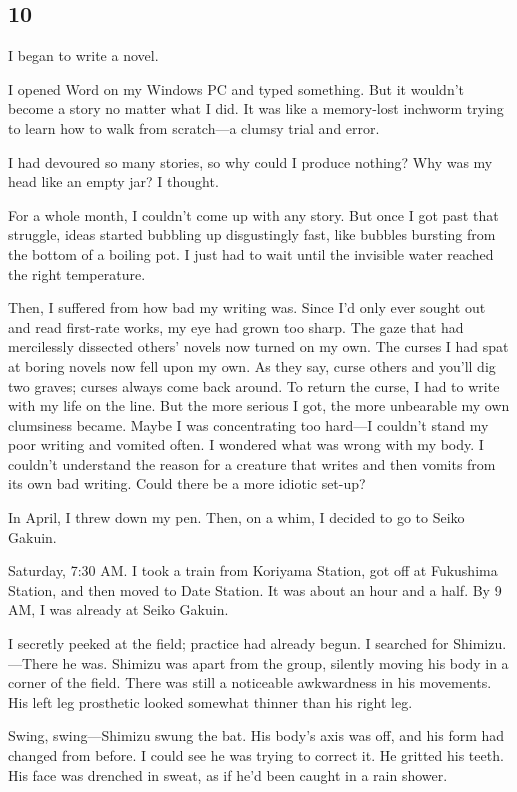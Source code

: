 \documentclass[
    a4paper,
    12pt,
    twoside,
    openany,
    UTF8,
    fontset=windows
]{ctexbook}
\begin{document}
\subsection*{10}

I began to write a novel.

I opened Word on my Windows PC and typed something. But it wouldn't become a story no matter what I did. It was like a memory-lost inchworm trying to learn how to walk from scratch—a clumsy trial and error.

I had devoured so many stories, so why could I produce nothing? Why was my head like an empty jar? I thought.

For a whole month, I couldn't come up with any story. But once I got past that struggle, ideas started bubbling up disgustingly fast, like bubbles bursting from the bottom of a boiling pot. I just had to wait until the invisible water reached the right temperature.

Then, I suffered from how bad my writing was. Since I'd only ever sought out and read first-rate works, my eye had grown too sharp. The gaze that had mercilessly dissected others' novels now turned on my own. The curses I had spat at boring novels now fell upon my own. As they say, curse others and you'll dig two graves; curses always come back around. To return the curse, I had to write with my life on the line. But the more serious I got, the more unbearable my own clumsiness became. Maybe I was concentrating too hard—I couldn't stand my poor writing and vomited often. I wondered what was wrong with my body. I couldn't understand the reason for a creature that writes and then vomits from its own bad writing. Could there be a more idiotic set-up?

In April, I threw down my pen. Then, on a whim, I decided to go to Seiko Gakuin.

Saturday, 7:30 AM. I took a train from Koriyama Station, got off at Fukushima Station, and then moved to Date Station. It was about an hour and a half. By 9 AM, I was already at Seiko Gakuin.

I secretly peeked at the field; practice had already begun. I searched for Shimizu.---There he was. Shimizu was apart from the group, silently moving his body in a corner of the field. There was still a noticeable awkwardness in his movements. His left leg prosthetic looked somewhat thinner than his right leg.

Swing, swing—Shimizu swung the bat. His body's axis was off, and his form had changed from before. I could see he was trying to correct it. He gritted his teeth. His face was drenched in sweat, as if he'd been caught in a rain shower.
\end{document}
